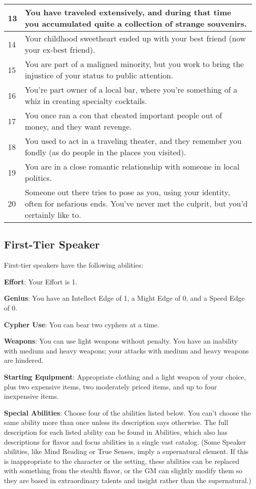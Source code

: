 \begin{table*}
\begin{tabularx}{\textwidth}{| p{} | p{} |}
13 & You have traveled extensively, and during that time you accumulated quite a collection of strange souvenirs. \\ \hline
14 & Your childhood sweetheart ended up with your best friend (now your ex-best friend). \\ \hline
15 & You are part of a maligned minority, but you work to bring the injustice of your status to public attention. \\ \hline
16 & You’re part owner of a local bar, where you’re something of a whiz in creating specialty cocktails. \\ \hline
17 & You once ran a con that cheated important people out of money, and they want revenge.  \\ \hline
18 & You used to act in a traveling theater, and they remember you fondly (as do people in the places you visited). \\ \hline
19 & You are in a close romantic relationship with someone in local politics. \\ \hline
20 & Someone out there tries to pose as you, using your identity, often for nefarious ends. You’ve never met the culprit, but you’d certainly like to. \\ \hline

\end{tabularx}

\end{table*}

\subsection{First-Tier Speaker}

First-tier speakers have the following abilities:

\textbf{Effort}: Your Effort is 1.

\textbf{Genius}: You have an Intellect Edge of 1, a Might Edge of 0, and a Speed Edge of 0.

\textbf{Cypher Use}: You can bear two cyphers at a time.

\textbf{Weapons}: You can use light weapons without penalty. You have an inability with medium and heavy weapons; your attacks with medium and heavy weapons are hindered.

\textbf{Starting Equipment}: Appropriate clothing and a light weapon of your choice, plus two expensive items, two moderately priced items, and up to four inexpensive items.

\textbf{Special Abilities}: Choose four of the abilities listed below. You can’t choose the same ability more than once unless its description says otherwise. The full description for each listed ability can be found in Abilities, which also has descriptions for flavor and focus abilities in a single vast catalog. (Some Speaker abilities, like Mind Reading or True Senses, imply a supernatural element. If this is inappropriate to the character or the setting, these abilities can be replaced with something from the stealth flavor, or the GM can slightly modify them so they are based in extraordinary talents and insight rather than the supernatural.)

